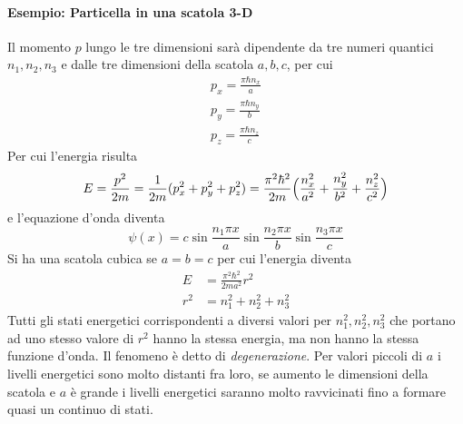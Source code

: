 \paragraph{Esempio: Particella in una scatola 3-D}
Il momento $p$ lungo le tre dimensioni sarà dipendente da tre numeri quantici $n_1,n_2,n_3$ e dalle tre dimensioni della scatola $a,b,c$, per cui
\begin{equation}
\begin{split}
p_x = \frac{\pi \hbar n_x}{a} \\
p_y = \frac{\pi \hbar n_y}{b} \\
p_z = \frac{\pi \hbar n_z}{c}
\end{split}
\end{equation}
Per cui l'energia risulta
\begin{equation}
E = \frac{p^2}{2m} = \frac{1}{2m} ( p_x^2 + p_y^2 + p_z^2 )= \frac{\pi^2 \hbar^2}{2m} \Bigl(  \frac{n_x^2}{a^2} + \frac{n_y^2}{b^2} + \frac{n_z^2}{c^2}  \Bigr)
\end{equation}
e l'equazione d'onda diventa
\begin{equation}
\psi(x) = c \sin \frac{n_1 \pi x}{a} \sin \frac{n_2 \pi x}{b} \sin \frac{n_3 \pi x}{c}
\end{equation}
Si ha una scatola cubica se $a=b=c$ per cui l'energia diventa
\begin{equation}
\begin{split}
E & = \frac{\pi^2 \hbar^2}{2 m a^2} r^2 \\ 
r^2 & = n_1^2 + n_2^2 + n_3^2
\end{split}
\end{equation}
Tutti gli stati energetici corrispondenti a diversi valori per $n_1^2, n_2^2, n_3^2$ che portano ad uno stesso valore di $r^2$ hanno la stessa energia, ma non hanno la stessa funzione d'onda.
Il fenomeno è detto di \textit{degenerazione}.
Per valori piccoli di $a$ i livelli energetici sono molto distanti fra loro, se aumento le dimensioni della scatola e $a$ è grande i livelli energetici saranno molto ravvicinati fino a formare quasi un continuo di stati.


